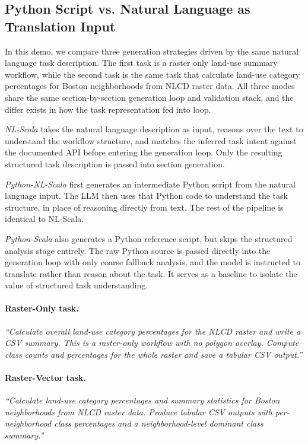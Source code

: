 \subsection{Python Script vs. Natural Language as Translation Input}
In this demo, we compare three generation strategies driven by the same natural language task description. The first task is a raster only land-use summary workflow, while the second task is the same task that calculate land-use category percentages for Boston neighborhoods from NLCD raster data.
All three modes share the same section-by-section generation loop and validation stack, and the differ exists in how the task representation fed into loop. 

\textit{NL-Scala} takes the natural language description as input, reasons over the text to understand the workflow structure, and matches
the inferred task intent against the documented API before entering the
generation loop. Only the resulting structured task description is passed into section generation.

\textit{Python-NL-Scala} first generates an intermediate Python script from the natural language input. The LLM then uses that Python code to understand the task structure, in place of reasoning directly from text. The rest of the pipeline is identical to NL-Scala.

\textit{Python-Scala} also generates a Python reference script, but skips the structured analysis stage entirely. The raw Python source is passed directly into the generation loop with only coarse fallback analysis, and the model is instructed to translate rather than reason about the task. It serves as a baseline to isolate the value of structured task understanding.



\paragraph{Raster-Only task.} \textit{``Calculate overall land-use category 
percentages for the NLCD raster and write a CSV summary. This is a 
raster-only workflow with no polygon overlay. Compute class counts and 
percentages for the whole raster and save a tabular CSV output.''}
\paragraph{Raster-Vector task.} \textit{``Calculate land-use category 
percentages and summary statistics for Boston neighborhoods from NLCD 
raster data. Produce tabular CSV 
outputs with per-neighborhood class percentages and a neighborhood-level 
dominant class summary.''}

